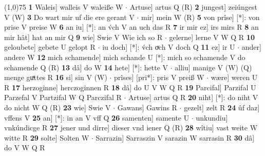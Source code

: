 \documentclass[8pt,a4paper,notitlepage]{article}
\begin{document}
\begin{table}[ht]
\begin{minipage}[t]{0.5\linewidth}
\line(1,0){75} \newline
\textbf{1} Waleis] walleis V waleiße W  $\cdot$ Artuse] artus Q (R) \textbf{2} jungest] zeiúngest V (W) \textbf{3} Do wart mir uf die ere gerant V  $\cdot$ mir] mein W (R) \textbf{5} von prîse] [*]: von prise V preise W \textbf{6} an iu] [*]: an v́ch V an uch das R \textbf{7} ir mir ez] irs mirs R \textbf{8} an mir hât] hat an mir Q \textbf{9} wie] Swie V Wie ich so R  $\cdot$ gelerne] lerne V W Q R \textbf{10} geloubete] gebete U gelopt R  $\cdot$ iu doch] [*]: v́ch oͮch V doch Q \textbf{11} ez] ir U  $\cdot$ ander] andere W \textbf{12} mich schamende] mich schande U [*]: mich so schamende V do schamende Q (R) \textbf{13} dâ] do W \textbf{14} hete] [*]: hette V  $\cdot$ alliu] manige V (W) (Q) menge guͯttes R \textbf{16} si] sin V (W)  $\cdot$ prîses] [pri*]: pris V preiß W  $\cdot$ wære] weren U R \textbf{17} herzoginne] herczoginnen R \textbf{18} dâ] do U V W Q R \textbf{19} Parcifal] Parzifal U Parzefal V Partzifal W Q Parczifal R  $\cdot$ Artuse] artus Q R \textbf{20} niht] [*]: do niht V do nicht W Q (R) \textbf{23} wie] Swie V  $\cdot$ Gawans] Gawins R  $\cdot$ gezelt] zelt R \textbf{24} ûf daz] vffens V \textbf{25} an] [*]: in an V vff Q \textbf{26} samenten] samente U  $\cdot$ unkundiu] vnkúndicge R \textbf{27} jener und dirre] dieser vnd iener Q (R) \textbf{28} wîtiu] vast weite W witte R \textbf{29} solte] Solten W  $\cdot$ Sarrazin] Sarraszin V sarazin W sarrasin R \textbf{30} dâ] do V W Q R \newline
\end{minipage}
\end{table}
\end{document}
